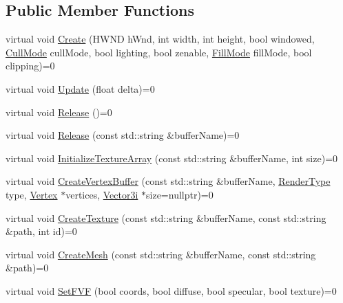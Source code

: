 \subsection*{Public Member Functions}
\begin{DoxyCompactItemize}
\item 
virtual void \mbox{\hyperlink{classse_1_1_abstract_renderer_a5c7e19127084d6bee7da63e3838d3c36}{Create}} (H\+W\+ND h\+Wnd, int width, int height, bool windowed, \mbox{\hyperlink{namespacese_a2447de8e300e86ac4a8893e0486fc3bb}{Cull\+Mode}} cull\+Mode, bool lighting, bool zenable, \mbox{\hyperlink{namespacese_a7ab38efb91dff288cc8279bedd6bc02c}{Fill\+Mode}} fill\+Mode, bool clipping)=0
\item 
virtual void \mbox{\hyperlink{classse_1_1_abstract_renderer_aae49e7417663d6a5aca34a2bb37b4b28}{Update}} (float delta)=0
\item 
virtual void \mbox{\hyperlink{classse_1_1_abstract_renderer_a98e35b7db62827580573185ed91b25bb}{Release}} ()=0
\item 
virtual void \mbox{\hyperlink{classse_1_1_abstract_renderer_af6d6d012f070f95d4c49713002872fcc}{Release}} (const std\+::string \&buffer\+Name)=0
\item 
virtual void \mbox{\hyperlink{classse_1_1_abstract_renderer_afd7697df1d4958ec3b0fa13109a269a1}{Initialize\+Texture\+Array}} (const std\+::string \&buffer\+Name, int size)=0
\item 
virtual void \mbox{\hyperlink{classse_1_1_abstract_renderer_a953d57d04771acae78c3725bee3639d4}{Create\+Vertex\+Buffer}} (const std\+::string \&buffer\+Name, \mbox{\hyperlink{namespacese_a9ed62241331cac830c5c1ba8450afc2b}{Render\+Type}} type, \mbox{\hyperlink{structse_1_1_vertex}{Vertex}} $\ast$vertices, \mbox{\hyperlink{namespacese_ada11715de7cf6e87b5dfb4611fe68d29}{Vector3i}} $\ast$size=nullptr)=0
\item 
virtual void \mbox{\hyperlink{classse_1_1_abstract_renderer_a89f2efd2ee68cfb6735e51ce87206dfd}{Create\+Texture}} (const std\+::string \&buffer\+Name, const std\+::string \&path, int id)=0
\item 
virtual void \mbox{\hyperlink{classse_1_1_abstract_renderer_a4a3e8836f7a8b1b35a5f7cb1b4231476}{Create\+Mesh}} (const std\+::string \&buffer\+Name, const std\+::string \&path)=0
\item 
virtual void \mbox{\hyperlink{classse_1_1_abstract_renderer_ad1f734c1726062752a3d43b5eaf77c04}{Set\+F\+VF}} (bool coords, bool diffuse, bool specular, bool texture)=0
\item 

\end{DoxyCompactItemize}
